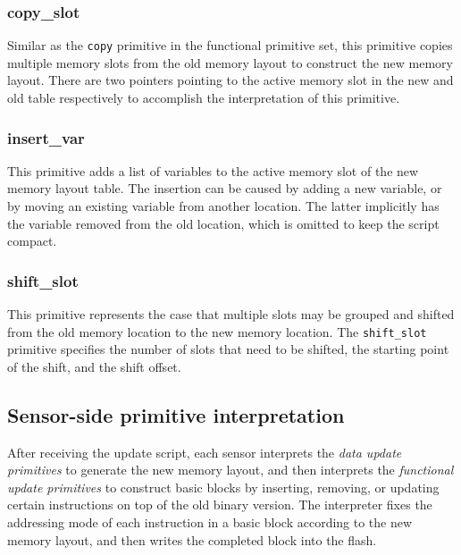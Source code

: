 \subsubsection{copy\_slot}  Similar as the {\tt copy} primitive in the functional primitive set, this primitive copies multiple memory slots from the old memory layout to construct the new memory layout. There are two pointers pointing to the active memory slot in the new and old table respectively to accomplish the interpretation of this primitive.

\subsubsection{insert\_var} This primitive adds a list of variables to the active memory slot of the new memory layout table.
The insertion can be caused by adding a new variable, or by moving an existing variable from another location. The latter implicitly has the variable removed from the old location, which is omitted to keep the script compact. 

\subsubsection{shift\_slot} This primitive represents the case that multiple slots may be grouped and shifted from the old memory location to the new memory location. The {\tt shift\_slot} primitive specifies the number of slots that need to be shifted, the starting point of the shift, and the shift offset.


\subsection{Sensor-side primitive interpretation}

After receiving the update script, each sensor interprets the {\em data update primitives} to generate the new memory layout, and then interprets the {\em functional update primitives} to construct basic blocks by inserting, removing, or updating certain instructions on top of the old binary version. The interpreter fixes the addressing mode of each instruction in a basic block according to the new memory layout, and then writes the completed block into the flash.


